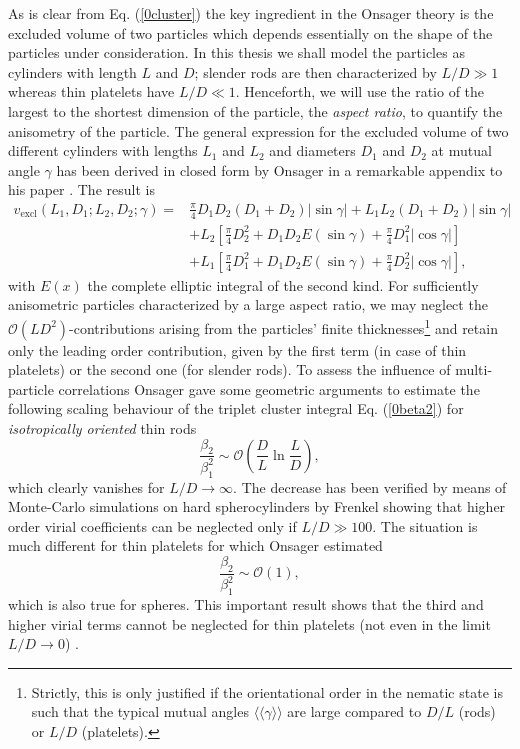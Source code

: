\documentclass[amssymb]{revtex4}
\begin{document}
As is clear from Eq. (\ref{0cluster}) the key ingredient in the Onsager theory is the excluded volume of two particles
which depends essentially on the shape of the particles under consideration.	
In this thesis we shall model the particles as cylinders with length $L$ and $D$;
slender rods are then characterized by  $L/D\gg 1$ whereas thin platelets
have $L/D\ll 1$. Henceforth, we will use the 
ratio of the largest to the shortest dimension of the particle, the {\em aspect ratio}, to quantify the anisometry of the particle.
The general expression for the excluded volume of
two different cylinders with lengths $L_{1}$ and $L_{2}$ and diameters $D_{1}$ and $D_{2}$ at mutual angle 
$\gamma$ has been derived
in closed form by Onsager in a remarkable appendix to his paper \cite{Onsager}. The result is
\begin{align}
v_{\text{excl}}(L_{1},D_{1};L_{2},D_{2};\gamma)=& \frac{\pi}{4}D_{1}D_{2}(D_{1}+D_{2})\left|\sin\gamma\right| +L_{1}L_{2}(D_{1}+D_{2})
\left|\sin\gamma\right| \nonumber  \\
&+L_{2}\left[\frac{\pi}{4}D_{2}^{2}+D_{1}D_{2}E(\sin\gamma)+\frac{\pi}{4}D_{1}^{2} \left|\cos\gamma \right| \right] \nonumber \\
&+L_{1}\left[\frac{\pi}{4}D_{1}^{2}+D_{1}D_{2}E(\sin\gamma)+\frac{\pi}{4}D_{2}^{2} \left|\cos\gamma \right| \right], 
\label{0evonsager}
\end{align}
with $E(x)$ the complete elliptic integral of the second kind. For sufficiently anisometric particles characterized by a  large aspect ratio, 
we may neglect the $\mathcal{O}(LD^{2})$-contributions arising from the particles' finite thicknesses\footnote{Strictly, 
this is only justified if the orientational order in the nematic state is such that the  typical mutual angles $ \langle\langle\gamma \rangle\rangle $ are large compared 
to $D/L$ (rods) or $L/D$ (platelets).} and  retain 
only the leading order contribution, given by the first term (in case of thin platelets) 
or the second one (for slender rods).
To assess the influence of  multi-particle correlations 
Onsager gave some geometric arguments to estimate the following scaling behaviour of the triplet cluster integral 
Eq. (\ref{0beta2}) for {\em isotropically oriented} thin rods
\begin{equation}
\frac{\beta_{2}}{\beta_{1}^{2}}\sim \mathcal{O}\left(\frac{D}{L}\ln\frac{L}{D}\right), 
\end{equation}
which clearly vanishes for $L/D \rightarrow \infty $.
The decrease  has been  verified by means of Monte-Carlo simulations on hard spherocylinders by Frenkel
\cite{Frenkel87,Frenkel87err}
showing that higher order virial coefficients can be neglected only if $L/D\gg 100$.
The situation is much different for thin platelets for which Onsager estimated
\begin{equation}
\frac{\beta_{2}}{\beta_{1}^{2}}\sim \mathcal{O}(1), \label{0clusterplate}
\end{equation}
which is also true for spheres. This important result shows that the third and higher
virial terms cannot be neglected for thin platelets (not even in the limit $L/D\rightarrow 0$) \cite{Veerman}.
\end{document}
